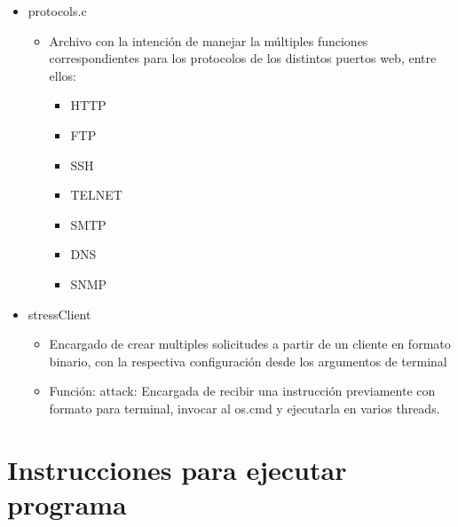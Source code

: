 \documentclass{report}
\begin{document}
\begin{itemize}
    \item protocols.c
    \begin{itemize}
      \item Archivo con la intención de manejar la múltiples funciones correspondientes para los protocolos de los distintos puertos web, entre ellos:
      
        \begin{itemize}
            \item HTTP
            \item FTP
            \item SSH
            \item TELNET
            \item SMTP
            \item DNS
            \item SNMP
        \end{itemize}
    \end{itemize}
    
    \item stressClient
    \begin{itemize}
      \item Encargado de crear multiples solicitudes a partir de un cliente en formato binario, con la respectiva configuración desde los argumentos de terminal
      \item Función: attack: Encargada de recibir una instrucción previamente con formato para terminal, invocar al os.cmd y ejecutarla en varios threads.
    \end{itemize}
    
\end{itemize}

\newpage
\section{Instrucciones para ejecutar programa}
\end{document}
